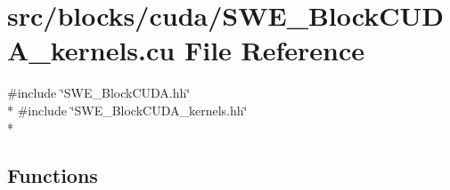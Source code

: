 \hypertarget{SWE__BlockCUDA__kernels_8cu}{\section{src/blocks/cuda/\-S\-W\-E\-\_\-\-Block\-C\-U\-D\-A\-\_\-kernels.cu File Reference}
\label{SWE__BlockCUDA__kernels_8cu}
}
{\ttfamily \#include \char`\"{}S\-W\-E\-\_\-\-Block\-C\-U\-D\-A.\-hh\char`\"{}}\\*
{\ttfamily \#include \char`\"{}S\-W\-E\-\_\-\-Block\-C\-U\-D\-A\-\_\-kernels.\-hh\char`\"{}}\\*
\subsection*{Functions}
